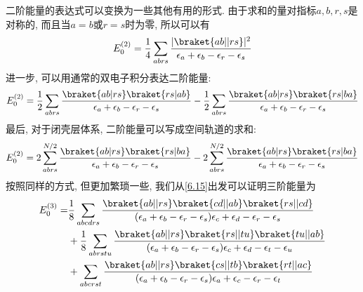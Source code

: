 二阶能量的表达式可以变换为一些其他有用的形式. 
由于求和的量对指标$a,b, r,s$是对称的, 
而且当$a=b$或$r=s$时为零, 
所以可以有
\begin{align}
E_0^{(2)} = \frac{1}{4} \sum_{abrs}\frac{|\braket{ab||rs}|^2}{\epsilon_a + \epsilon_b -\epsilon_r-\epsilon_s}
\label{6.72}
\end{align}
进一步, 
可以用通常的双电子积分表达二阶能量:
\begin{align}
E_0^{(2)} = \frac{1}{2}\sum_{abrs}\frac{\braket{ab|rs}\braket{rs|ab}}{\epsilon_a + \epsilon_b -\epsilon_r-\epsilon_s}-\frac{1}{2}\sum_{abrs}\frac{\braket{ab|rs}\braket{rs|ba}}{\epsilon_a + \epsilon_b -\epsilon_r-\epsilon_s}
\label{6.73}
\end{align}
最后, 
对于闭壳层体系, 
二阶能量可以写成空间轨道的求和:
\begin{align}
E_0^{(2)} = 2\sum_{abrs}^{N/2}\frac{\braket{ab|rs}\braket{rs|ba}}{\epsilon_a + \epsilon_b -\epsilon_r-\epsilon_s}-2\sum_{abrs}^{N/2}\frac{\braket{ab|rs}\braket{rs|ba}}{\epsilon_a + \epsilon_b -\epsilon_r-\epsilon_s}
\label{6.74}
\end{align}
按照同样的方式, 
但更加繁琐一些, 
我们从\autoref{6.15}出发可以证明三阶能量为
\begin{align}
E_0^{(3)} = & \frac{1}{8} \sum_{abcdrs} \frac{\braket{ab||rs}\braket{cd||ab}\braket{rs||cd}}{(\epsilon_a + \epsilon_b -\epsilon_r-\epsilon_s){\epsilon_c + \epsilon_d -\epsilon_r-\epsilon_s}} \notag\\
          & + \frac{1}{8}\sum_{abrstu}\frac{\braket{ab||rs}\braket{rs||tu}\braket{tu||ab}}{(\epsilon_a + \epsilon_b -\epsilon_r-\epsilon_s){\epsilon_c + \epsilon_d -\epsilon_t-\epsilon_u}} \notag\\
          & + \sum_{abcrst}\frac{\braket{ab||rs}\braket{cs||tb}\braket{rt||ac}}{(\epsilon_a + \epsilon_b -\epsilon_r-\epsilon_s){\epsilon_a + \epsilon_c -\epsilon_r-\epsilon_t}}
          \label{6.75}
\end{align}

